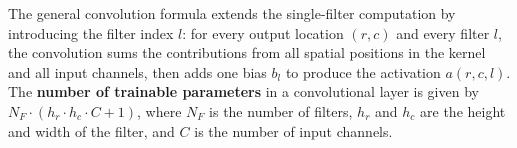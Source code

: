 \highspace
\begin{takeawaysbox}
    The general convolution formula extends the single-filter computation by introducing the filter index $l$: for every output location $(r,c)$ and every filter $l$, the convolution sums the contributions from all spatial positions in the kernel and all input channels, then adds one bias $b_{l}$ to produce the activation $a(r,c,l)$. The \textbf{number of trainable parameters} in a convolutional layer is given by $N_F \cdot (h_r \cdot h_c \cdot C + 1)$, where $N_F$ is the number of filters, $h_r$ and $h_c$ are the height and width of the filter, and $C$ is the number of input channels.
\end{takeawaysbox}